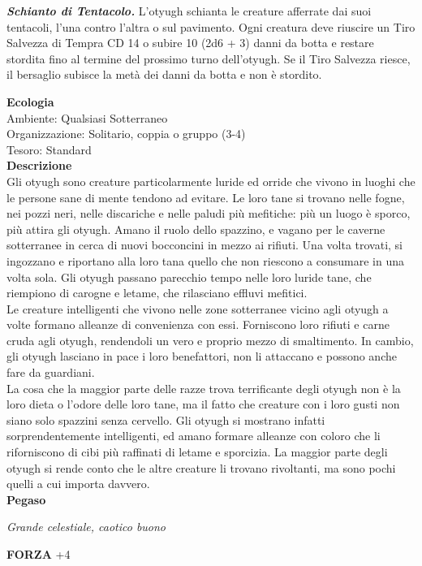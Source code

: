 \begin{multicols}{2}
\emph{\textbf{Schianto di Tentacolo.}} L'otyugh schianta le creature afferrate dai suoi tentacoli, l'una contro l'altra o sul pavimento. Ogni creatura deve riuscire un Tiro Salvezza di Tempra CD 14 o subire 10 (2d6 + 3) danni da botta e restare stordita fino al termine del prossimo turno dell'otyugh. Se il Tiro Salvezza riesce, il bersaglio subisce la metà dei danni da botta e non è stordito.

\textbf{Ecologia}\\
Ambiente: Qualsiasi Sotterraneo\\
Organizzazione: Solitario, coppia o gruppo (3-4)\\
Tesoro: Standard\\
\textbf{Descrizione}\\
Gli otyugh sono creature particolarmente luride ed orride che vivono in luoghi che le persone sane di mente tendono ad evitare. Le loro tane si trovano nelle fogne, nei pozzi neri, nelle discariche e nelle paludi più mefitiche: più un luogo è sporco, più attira gli otyugh. Amano il ruolo dello spazzino, e vagano per le caverne sotterranee in cerca di nuovi bocconcini in mezzo ai rifiuti. Una volta trovati, si ingozzano e riportano alla loro tana quello che non riescono a consumare in una volta sola. Gli otyugh passano parecchio tempo nelle loro luride tane, che riempiono di carogne e letame, che rilasciano effluvi mefitici.\\
Le creature intelligenti che vivono nelle zone sotterranee vicino agli otyugh a volte formano alleanze di convenienza con essi. Forniscono loro rifiuti e carne cruda agli otyugh, rendendoli un vero e proprio mezzo di smaltimento. In cambio, gli otyugh lasciano in pace i loro benefattori, non li attaccano e possono anche fare da guardiani.\\
La cosa che la maggior parte delle razze trova terrificante degli otyugh non è la loro dieta o l'odore delle loro tane, ma il fatto che creature con i loro gusti non siano solo spazzini senza cervello. Gli otyugh si mostrano infatti sorprendentemente intelligenti, ed amano formare alleanze con coloro che li riforniscono di cibi più raffinati di letame e sporcizia. La maggior parte degli otyugh si rende conto che le altre creature li trovano rivoltanti, ma sono pochi quelli a cui importa davvero.\\


\medskip{}\textbf{Pegaso}

\emph{Grande celestiale, caotico buono}

\textbf{FORZA} +4


\end{multicols}
